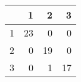\begin{tabular}{rrrr}
  \hline
 & 1 & 2 & 3 \\ 
  \hline
1 &  23 &   0 &   0 \\ 
  2 &   0 &  19 &   0 \\ 
  3 &   0 &   1 &  17 \\ 
   \hline
\end{tabular}

